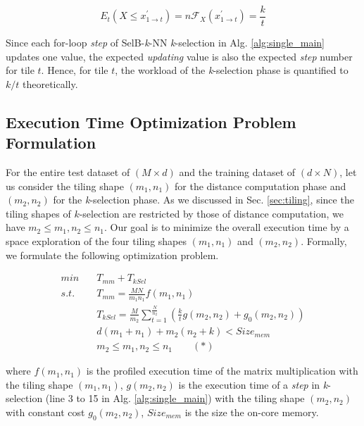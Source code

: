 \documentclass[12pt]{extbook}
\begin{document}
\begin{equation}
    E_{t}(X \le x^{\prime}_{1 \to t}) = n \mathcal{F}_{X}(x^{\prime}_{1 \to t}) = \frac{k}{t}
\end{equation}


Since each for-loop \textit{step} of SelB-\textit{k}-NN \textit{k}-selection in Alg. \ref{alg:single_main} updates one value, the expected \textit{updating} value is also the expected \textit{step} number for tile $t$. Hence, for tile $t$, the workload of the \textit{k}-selection phase is quantified to $k / t$ theoretically.

\subsection{Execution Time Optimization Problem Formulation}

For the entire test dataset of $(M \times d)$ and the training dataset of $(d \times N)$, let us consider the tiling shape $(m_{1}, n_{1})$ for the distance computation phase and $(m_{2}, n_{2})$ for the \textit{k}-selection phase. As we discussed in Sec. \ref{sec:tiling}, since the tiling shapes of $k$-selection are restricted by those of distance computation, we have $m_{2} \le m_{1}, n_{2} \le n_{1}$. Our goal is to minimize the overall execution time by a space exploration of the four tiling shapes $(m_{1}, n_{1})$ and $(m_{2}, n_{2})$. Formally, we formulate the following optimization problem.

\begin{equation}
    \label{eq:optimized}
    \begin{aligned}
        min\quad  &T_{mm} + T_{kSel} \\
        s.t.\quad &T_{mm} = \frac{MN}{m_{1}n_{1}} f(m_{1}, n_{1}) \\
                  &T_{kSel} = \frac{M}{m_{2}} \sum_{t=1}^{\frac{N}{n_{2}}}(\frac{k}{t}g(m_{2}, n_{2}) + g_{0}(m_{2}, n_{2})) \\
                  &d(m_1 + n_1) + m_2(n_2 + k) < Size_{mem} \\
                  &m_{2} \le m_{1}, n_{2} \le n_{1} \quad \quad (*)
    \end{aligned}
\end{equation}

where $f(m_{1}, n_{1})$ is the profiled execution time of the matrix multiplication with the tiling shape $(m_{1}, n_{1})$, $g(m_{2}, n_{2})$ is the execution time of a \textit{step} in \textit{k}-selection (line 3 to 15 in Alg. \ref{alg:single_main}) with the tiling shape $(m_{2}, n_{2})$ with constant cost $g_{0}(m_{2}, n_{2})$, $Size_{mem}$ is the size the on-core memory.
\end{document}
